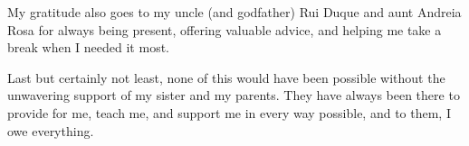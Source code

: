 \begin{acknowledgments}
  My gratitude also goes to my uncle (and godfather) Rui Duque and aunt Andreia
  Rosa for always being present, offering valuable advice, and helping me take a
  break when I needed it most.

  Last but certainly not least, none of this would have been possible without the
  unwavering support of my sister and my parents. They have always been there to
  provide for me, teach me, and support me in every way possible, and to them, I
  owe everything.

\end{acknowledgments}